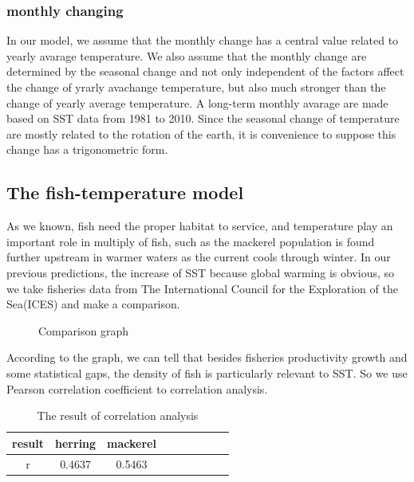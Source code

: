 \documentclass{mcmthesis}
\begin{document}
  \subsubsection{monthly changing}
    In our model, we assume that the monthly change has a central value related to yearly avarage temperature. We also assume that the monthly change are determined by the seasonal change and not only independent of the factors affect the change of yrarly avachange temperature, but also much stronger than the change of yearly average temperature. 
    A long-term monthly avarage are made based on SST data from 1981 to 2010. Since the seasonal change of temperature are mostly related to the rotation of the earth, it is convenience to suppose this change has a trigonometric form. 

 \subsection{The fish-temperature model}
  As we known, fish need the proper habitat to service, and temperature play an important role in multiply of fish, such as the mackerel population is found further upstream in warmer waters as the current cools through winter\cite{jansen2012migration}. In our previous predictions, the increase of  SST because global warming is obvious, so we take fisheries data  from The International Council for the Exploration of the Sea(ICES) and make a comparison. 

  \begin{figure}[tbp]
    \caption{Comparison graph}\label{figure1}
  \end{figure}

  According to the graph, we can tell that besides fisheries productivity growth and some statistical gaps, the density of fish is particularly relevant to SST. So we use Pearson correlation coefficient to correlation analysis. 

  \begin{table}[!htb]
    \centering
    \setlength{\abovecaptionskip}{0pt}%
    \setlength{\belowcaptionskip}{15pt}%
    \caption{The result of correlation analysis}
    \begin{tabular}{ccccccccc}
    \toprule[1.5pt]
    result &herring &mackerel\\
    \toprule[1.5pt]
    r&0.4637&0.5463\\
    \bottomrule[1.5pt]
    \end{tabular}
  \end{table}
\end{document}
